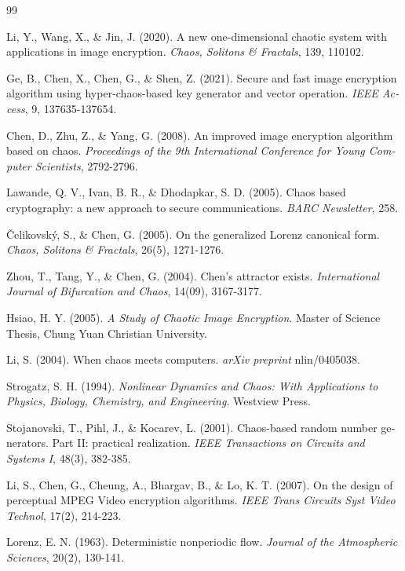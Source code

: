 \begin{thebibliography}{99}
\begin{LTRbibitems}
\begin{latin}
 Li, Y., Wang, X., \& Jin, J. (2020). A new one-dimensional chaotic system with applications in image encryption. \textit{Chaos, Solitons \& Fractals}, 139, 110102.

 Ge, B., Chen, X., Chen, G., \& Shen, Z. (2021). Secure and fast image encryption algorithm using hyper-chaos-based key generator and vector operation. \textit{IEEE Access}, 9, 137635-137654.

 Chen, D., Zhu, Z., \& Yang, G. (2008). An improved image encryption algorithm based on chaos. \textit{Proceedings of the 9th International Conference for Young Computer Scientists}, 2792-2796.

 Lawande, Q. V., Ivan, B. R., \& Dhodapkar, S. D. (2005). Chaos based cryptography: a new approach to secure communications. \textit{BARC Newsletter}, 258.

 Čelikovský, S., \& Chen, G. (2005). On the generalized Lorenz canonical form. \textit{Chaos, Solitons \& Fractals}, 26(5), 1271-1276.

 Zhou, T., Tang, Y., \& Chen, G. (2004). Chen's attractor exists. \textit{International Journal of Bifurcation and Chaos}, 14(09), 3167-3177.

 Hsiao, H. Y. (2005). \textit{A Study of Chaotic Image Encryption}. Master of Science Thesis, Chung Yuan Christian University.

 Li, S. (2004). When chaos meets computers. \textit{arXiv preprint} nlin/0405038.

 Strogatz, S. H. (1994). \textit{Nonlinear Dynamics and Chaos: With Applications to Physics, Biology, Chemistry, and Engineering}. Westview Press.

 Stojanovski, T., Pihl, J., \& Kocarev, L. (2001). Chaos-based random number generators. Part II: practical realization. \textit{IEEE Transactions on Circuits and Systems I}, 48(3), 382-385.

 Li, S., Chen, G., Cheung, A., Bhargav, B., \& Lo, K. T. (2007). On the design of perceptual MPEG Video encryption algorithms. \textit{IEEE Trans Circuits Syst Video Technol}, 17(2), 214-223.

 Lorenz, E. N. (1963). Deterministic nonperiodic flow. \textit{Journal of the Atmospheric Sciences}, 20(2), 130-141.


\end{latin}
\end{LTRbibitems}
\end{thebibliography}
